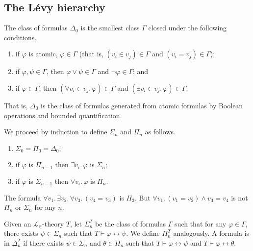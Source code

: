 \subsection{The L\'evy hierarchy}
\begin{definition}
    The class of formulas \( \Delta_0 \) is the smallest class \( \Gamma \) closed under the following conditions.
    \begin{enumerate}
        \item if \( \varphi \) is atomic, \( \varphi \in \Gamma \) (that is, \( (v_i \in v_j) \in \Gamma \) and \( (v_i = v_j) \in \Gamma \));
        \item if \( \varphi, \psi \in \Gamma \), then \( \varphi \vee \psi \in \Gamma \) and \( \neg\varphi \in \Gamma \); and
        \item if \( \varphi \in \Gamma \), then \( (\forall v_i \in v_j.\, \varphi) \in \Gamma \) and \( (\exists v_i \in v_j.\, \varphi) \in \Gamma \).
    \end{enumerate}
\end{definition}
That is, \( \Delta_0 \) is the class of formulas generated from atomic formulas by Boolean operations and bounded quantification.
\begin{definition}
    We proceed by induction to define \( \Sigma_n \) and \( \Pi_n \) as follows.
    \begin{enumerate}
        \item \( \Sigma_0 = \Pi_0 = \Delta_0 \);
        \item if \( \varphi \) is \( \Pi_{n-1} \) then \( \exists v_i.\, \varphi \) is \( \Sigma_n \);
        \item if \( \varphi \) is \( \Sigma_{n-1} \) then \( \forall v_i.\, \varphi \) is \( \Pi_n \).
    \end{enumerate}
\end{definition}
\begin{example}
    The formula \( \forall v_1.\, \exists v_2.\, \forall v_3.\, (v_4 = v_3) \) is \( \Pi_3 \).
    But \( \forall v_1.\, (v_1 = v_2) \wedge v_3 = v_4 \) is not \( \Pi_n \) or \( \Sigma_n \) for any \( n \).
\end{example}
\begin{definition}
    Given an \( \mathcal L_\in \)-theory \( T \), let \( \Sigma_n^T \) be the class of formulas \( \Gamma \) such that for any \( \varphi \in \Gamma \), there exists \( \psi \in \Sigma_n \) such that \( T \vdash \varphi \leftrightarrow \psi \).
    We define \( \Pi_n^T \) analogously.
    A formula is in \( \Delta_n^T \) if there exists \( \psi \in \Sigma_n \) and \( \theta \in \Pi_n \) such that \( T \vdash \varphi \leftrightarrow \psi \) and \( T \vdash \varphi \leftrightarrow \theta \).
\end{definition}
